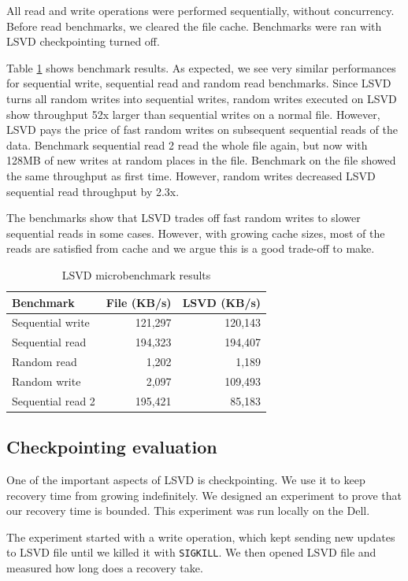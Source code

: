 All read and write operations were performed sequentially, without concurrency. Before read benchmarks, we cleared the file cache. Benchmarks were ran with LSVD checkpointing turned off.

Table \ref{tab:lsvd} shows benchmark results. As expected, we see very similar performances for sequential write, sequential read and random read benchmarks. Since LSVD turns all random writes into sequential writes, random writes executed on LSVD show throughput 52x larger than sequential writes on a normal file. However, LSVD pays the price of fast random writes on subsequent sequential reads of the data. Benchmark sequential read 2 read the whole file again, but now with 128MB of new writes at random places in the file. Benchmark on the file showed the same throughput as first time. However, random writes decreased LSVD sequential read throughput by 2.3x.

The benchmarks show that LSVD trades off fast random writes to slower sequential reads in some cases. However, with growing cache sizes, most of the reads are satisfied from cache and we argue this is a good trade-off to make.

\begin{table}
\centering
\caption{LSVD microbenchmark results}
\label{tab:lsvd}
\begin{tabular}{ | l | r | r | }
\hline
\textbf{Benchmark} & \textbf{File (KB/s)} & \textbf{LSVD (KB/s)} \\
\hline
Sequential write & 121,297 & 120,143 \\
\hline
Sequential read & 194,323 & 194,407 \\
\hline
Random read & 1,202 & 1,189 \\
\hline
Random write & 2,097 & 109,493 \\
\hline
Sequential read 2 & 195,421 & 85,183 \\
\hline
\end{tabular}
\end{table}

\subsection{Checkpointing evaluation}
One of the important aspects of LSVD is checkpointing. We use it to keep recovery time from growing indefinitely. We designed an experiment to prove that our recovery time is bounded. This experiment was run locally on the Dell.

The experiment started with a write operation, which kept sending new updates to LSVD file until we killed it with \texttt{SIGKILL}. We then opened LSVD file and measured how long does a recovery take.

